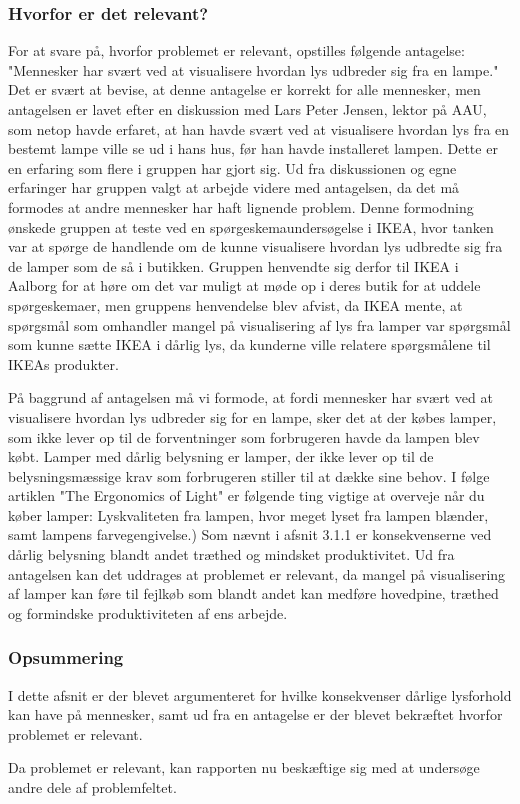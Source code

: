 \subsubsection{Hvorfor er det relevant?}
\label{sec:hvorfor_relavant}
For at svare på, hvorfor problemet er relevant, opstilles følgende antagelse: "Mennesker har svært ved at visualisere hvordan lys udbreder sig fra en lampe." Det er svært at bevise, at denne antagelse er korrekt for alle mennesker, men antagelsen er lavet efter en diskussion med Lars Peter Jensen, lektor på AAU, som netop havde erfaret, at han havde svært ved at visualisere hvordan lys fra en bestemt lampe ville se ud i hans hus, før han havde installeret lampen. Dette er en erfaring som flere i gruppen har gjort sig. Ud fra diskussionen og egne erfaringer har gruppen valgt at arbejde videre med antagelsen, da det må formodes at andre mennesker har haft lignende problem. Denne formodning ønskede gruppen at teste ved en spørgeskemaundersøgelse i IKEA, hvor tanken var at spørge de handlende om de kunne visualisere hvordan lys udbredte sig fra de lamper som de så i butikken. Gruppen henvendte sig derfor til IKEA i Aalborg for at høre om det var muligt at møde op i deres butik for at uddele spørgeskemaer, men gruppens henvendelse blev afvist, da IKEA mente, at spørgsmål som omhandler mangel på visualisering af lys fra lamper var spørgsmål som kunne sætte IKEA i dårlig lys, da kunderne ville relatere spørgsmålene til IKEAs produkter. 

På baggrund af antagelsen må vi formode, at fordi mennesker har svært ved at visualisere hvordan lys udbreder sig for en lampe, sker det at der købes lamper, som ikke lever op til de forventninger som forbrugeren havde da lampen blev købt. Lamper med dårlig belysning er lamper, der ikke lever op til de belysningsmæssige krav som forbrugeren stiller til at dække sine behov. I følge artiklen "The Ergonomics of Light" er følgende ting vigtige at overveje når du køber lamper: Lyskvaliteten fra lampen, hvor meget lyset fra lampen blænder, samt lampens farvegengivelse\cite{lys_konsekvenser}.) Som nævnt i afsnit 3.1.1 er konsekvenserne ved dårlig belysning blandt andet træthed og mindsket produktivitet.
Ud fra antagelsen kan det uddrages at problemet er relevant, da mangel på visualisering af lamper kan føre til fejlkøb som blandt andet kan medføre hovedpine, træthed og formindske produktiviteten af ens arbejde.

\subsubsection*{Opsummering}
I dette afsnit er der blevet argumenteret for hvilke konsekvenser dårlige lysforhold kan have på mennesker, samt ud fra en antagelse er der blevet bekræftet hvorfor problemet er relevant. 

Da problemet er relevant, kan rapporten nu beskæftige sig med at undersøge andre dele af problemfeltet. 

